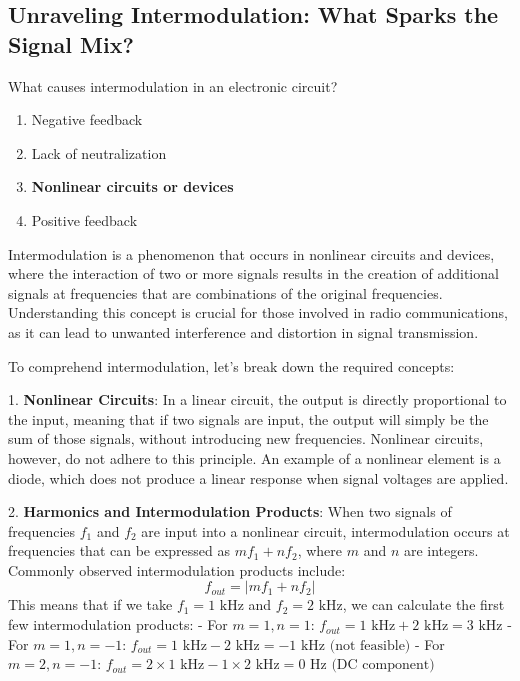 \subsection*{Unraveling Intermodulation: What Sparks the Signal Mix?}

\begin{tcolorbox}[colback=gray!10, colframe=black, title=E4D08]

What causes intermodulation in an electronic circuit?

\begin{enumerate}[label=\Alph*.]
    \item Negative feedback
    \item Lack of neutralization
    \item \textbf{Nonlinear circuits or devices}
    \item Positive feedback
\end{enumerate} \end{tcolorbox}

Intermodulation is a phenomenon that occurs in nonlinear circuits and devices, where the interaction of two or more signals results in the creation of additional signals at frequencies that are combinations of the original frequencies. Understanding this concept is crucial for those involved in radio communications, as it can lead to unwanted interference and distortion in signal transmission.

To comprehend intermodulation, let's break down the required concepts:

1. \textbf{Nonlinear Circuits}: In a linear circuit, the output is directly proportional to the input, meaning that if two signals are input, the output will simply be the sum of those signals, without introducing new frequencies. Nonlinear circuits, however, do not adhere to this principle. An example of a nonlinear element is a diode, which does not produce a linear response when signal voltages are applied.

2. \textbf{Harmonics and Intermodulation Products}: When two signals of frequencies \(f_1\) and \(f_2\) are input into a nonlinear circuit, intermodulation occurs at frequencies that can be expressed as \(mf_1 + nf_2\), where \(m\) and \(n\) are integers. Commonly observed intermodulation products include:
   \[
   f_{out} = |mf_1 + nf_2|
   \]
   This means that if we take \(f_1 = 1 \text{ kHz}\) and \(f_2 = 2 \text{ kHz}\), we can calculate the first few intermodulation products:
   - For \(m=1, n=1\): \(f_{out} = 1 \text{ kHz} + 2 \text{ kHz} = 3 \text{ kHz}\)
   - For \(m=1, n=-1\): \(f_{out} = 1 \text{ kHz} - 2 \text{ kHz} = -1 \text{ kHz} \text{ (not feasible)}\)
   - For \(m=2, n=-1\): \(f_{out} = 2 \times 1 \text{ kHz} - 1 \times 2 \text{ kHz} = 0 \text{ Hz} \text{ (DC component)}\)

